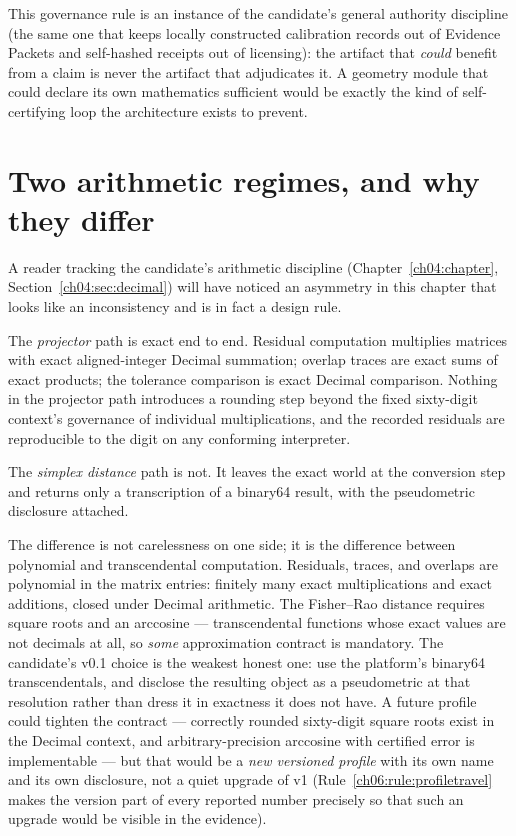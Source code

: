 This governance rule is an instance of the candidate's general
authority discipline (the same one that keeps locally constructed
calibration records out of Evidence Packets and self-hashed receipts out
of licensing): the artifact that \emph{could} benefit from a claim is
never the artifact that adjudicates it. A geometry module that could
declare its own mathematics sufficient would be exactly the kind of
self-certifying loop the architecture exists to prevent.

\section{Two arithmetic regimes, and why they differ}
\label{ch06:sec:regimes}

A reader tracking the candidate's arithmetic discipline
(Chapter~\ref{ch04:chapter}, Section~\ref{ch04:sec:decimal}) will have
noticed an asymmetry in this chapter that looks like an inconsistency
and is in fact a design rule.

The \emph{projector} path is exact end to end. Residual computation
multiplies matrices with exact aligned-integer Decimal summation;
overlap traces are exact sums of exact products; the tolerance
comparison is exact Decimal comparison. Nothing in the projector path
introduces a rounding step beyond the fixed sixty-digit context's
governance of individual multiplications, and the recorded residuals
are reproducible to the digit on any conforming interpreter.

The \emph{simplex distance} path is not. It leaves the exact world at
the conversion step and returns only a transcription of a binary64
result, with the pseudometric disclosure attached.

The difference is not carelessness on one side; it is the difference
between polynomial and transcendental computation. Residuals, traces,
and overlaps are polynomial in the matrix entries: finitely many exact
multiplications and exact additions, closed under Decimal arithmetic.
The Fisher--Rao distance requires square roots and an arccosine ---
transcendental functions whose exact values are not decimals at all, so
\emph{some} approximation contract is mandatory. The candidate's v0.1
choice is the weakest honest one: use the platform's binary64
transcendentals, and disclose the resulting object as a pseudometric at
that resolution rather than dress it in exactness it does not have. A
future profile could tighten the contract --- correctly rounded
sixty-digit square roots exist in the Decimal context, and
arbitrary-precision arccosine with certified error is implementable ---
but that would be a \emph{new versioned profile} with its own name and
its own disclosure, not a quiet upgrade of v1
(Rule~\ref{ch06:rule:profiletravel} makes the version part of every
reported number precisely so that such an upgrade would be visible in
the evidence).

